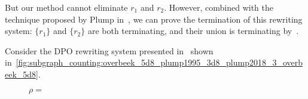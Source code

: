 \begin{example}
But our method cannot eliminate $r_1$ and $r_2$. However, combined with the technique proposed by Plump in~\cite{plump2018modular}, we can prove the termination of this rewriting system: $\{r_1\}$ and $\{r_2\}$ are both terminating, and their union is terminating by~\cite{plump2018modular}.
\end{example}


\begin{example}
  \label{ex:overbeek_5d8_plump1995_3d8_plump2018_3_overbeek_5d8}
  Consider the DPO rewriting system presented in~\cite[Example 3.8]{plump1995ontermination} shown in~\autoref{fig:subgraph_counting:overbeek_5d8_plump1995_3d8_plump2018_3_overbeek_5d8}.

  \begin{figure}[!ht]
    \centering
\begin{center}
 $\rho = ${ 
 }
\end{center}


\end{figure}
\end{example}
